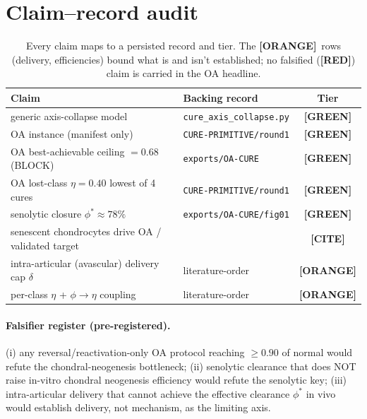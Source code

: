 \documentclass[11pt,a4paper]{article}
\newcommand{\tierbadge}[2]{\textcolor{#1}{\textbf{[#2]}}}
\providecommand{\tierGreen}{\tierbadge{green!45!black}{GREEN}}
\providecommand{\tierYellow}{\tierbadge{yellow!50!black}{CITE}}
\providecommand{\tierOrange}{\tierbadge{orange!80!black}{ORANGE}}
\providecommand{\tierRed}{\tierbadge{red!75!black}{RED}}
\begin{document}
\appendix
\section{Claim--record audit}
\label{app:audit}
\begin{table}[h]\centering\small
\begin{tabular}{@{}>{\raggedright\arraybackslash}m{7.2cm} >{\raggedright\arraybackslash}m{3.8cm} c@{}}
\toprule
\textbf{Claim} & \textbf{Backing record} & \textbf{Tier} \\
\midrule
generic axis-collapse model & \texttt{cure\_axis\_collapse.py} & \tierGreen \\
OA instance (manifest only) & \texttt{CURE-PRIMITIVE/round1} & \tierGreen \\
OA best-achievable ceiling $=0.68$ (BLOCK) & \texttt{exports/OA-CURE} & \tierGreen \\
OA lost-class $\eta=0.40$ lowest of 4 cures & \texttt{CURE-PRIMITIVE/round1} & \tierGreen \\
senolytic closure $\phi^\ast\!\approx\!78\%$ & \texttt{exports/OA-CURE/fig01} & \tierGreen \\
senescent chondrocytes drive OA / validated target & \citep{jeon2017,coryell2021} & \tierYellow \\
intra-articular (avascular) delivery cap $\delta$ & literature-order & \tierOrange \\
per-class $\eta$ + $\phi\!\to\!\eta$ coupling & literature-order & \tierOrange \\
\bottomrule
\end{tabular}
\caption{Every claim maps to a persisted record and tier. The \tierOrange\ rows
(delivery, efficiencies) bound what is and isn't established; no falsified (\tierRed)
claim is carried in the OA headline.}
\label{tab:audit}
\end{table}

\paragraph{Falsifier register (pre-registered).} (i) any reversal/reactivation-only OA
protocol reaching $\geq 0.90$ of normal would refute the chondral-neogenesis bottleneck;
(ii) senolytic clearance that does NOT raise in-vitro chondral neogenesis efficiency would
refute the senolytic key; (iii) intra-articular delivery that cannot achieve the effective
clearance $\phi^\ast$ in vivo would establish delivery, not mechanism, as the limiting axis.
\end{document}
